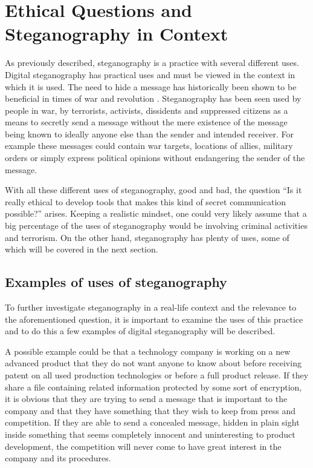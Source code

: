 \section{Ethical Questions and Steganography in Context}
As previously described, steganography is a practice with several different uses.
Digital steganography has practical uses and must be viewed in the context in which it is used.
The need to hide a message has historically been shown to be beneficial in times of war and revolution \citep{Singh2001}.
Steganography has been seen used by people in war, by terrorists, activists, dissidents and suppressed citizens as a means to secretly send a message without the mere existence of the message being known to ideally anyone else than the sender and intended receiver.
For example these messages could contain war targets, locations of allies, military orders or simply express political opinions without endangering the sender of the message.

With all these different uses of steganography, good and bad, the question ``Is it really ethical to develop tools that makes this kind of secret communication possible?'' arises. 
Keeping a realistic mindset, one could very likely assume that a big percentage of the uses of steganography would be involving criminal activities and terrorism.
On the other hand, steganography has plenty of uses, some of which will be covered in the next section.

\subsection{Examples of uses of steganography}
To further investigate steganography in a real-life context and the relevance to the aforementioned question, it is important to examine the uses of this practice and to do this a few examples of digital steganography will be described.

A possible example could be that a technology company is working on a new advanced product that they do not want anyone to know about before receiving patent on all used production technologies or before a full product release.
If they share a file containing related information protected by some sort of encryption, it is obvious that they are trying to send a message that is important to the company and that they have something that they wish to keep from press and competition.
If they are able to send a concealed message, hidden in plain sight inside something that seems completely innocent and uninteresting to product development, the competition will never come to have great interest in the company and its procedures.

